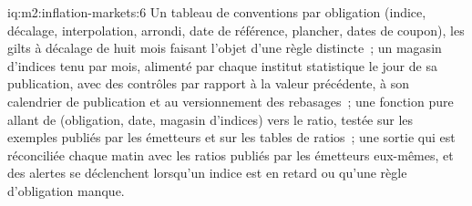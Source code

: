 \begin{solution}{iq:m2:inflation-markets:6}
Un tableau de conventions par obligation (indice, décalage, interpolation, arrondi, date de référence,
plancher, dates de coupon), les gilts à décalage de huit mois faisant l'objet d'une règle distincte~; un magasin
d'indices tenu par mois, alimenté par chaque institut statistique le jour de sa publication,
avec des contrôles par rapport à la valeur précédente, à son calendrier de publication et au
versionnement des rebasages~; une fonction pure allant de (obligation, date, magasin d'indices) vers le ratio,
testée sur les exemples publiés par les émetteurs et sur les tables de ratios~; une sortie qui est
réconciliée chaque matin avec les ratios publiés par les émetteurs eux-mêmes, et des alertes
se déclenchent lorsqu'un indice est en retard ou qu'une règle d'obligation manque.
\end{solution}
